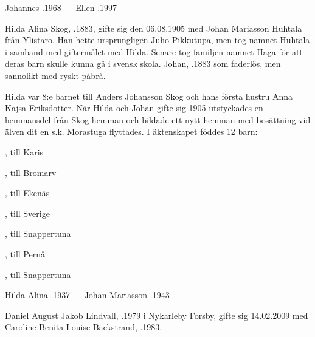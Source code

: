 Johannes .1968   ---    Ellen .1997


Hilda Alina Skog, .1883, gifte sig den 06.08.1905 med Johan Mariasson Huhtala från Ylistaro. Han hette ursprungligen Juho Pikkutupa, men tog namnet Huhtala i samband med giftermålet med Hilda. Senare tog familjen namnet Haga för att deras barn skulle kunna gå i svensk skola. Johan, .1883 som faderlös, men sannolikt med ryskt påbrå.

Hilda var 8:e barnet till Anders Johansson Skog och hans första hustru Anna Kajsa Eriksdotter. När Hilda och Johan gifte sig 1905 utstyckades en hemmansdel från Skog hemman och bildade ett nytt hemman med bosättning vid älven dit en s.k. Morastuga flyttades. I äktenskapet föddes 12 barn:
\begin{jhchildren}
  \item {}
  \item {}
  \item {}
  \item {}, till Karis
  \item {}
  \item {}, till Bromarv
  \item {}, till Ekenäs
  \item {}, till Sverige
  \item {}, till Snappertuna
  \item {}
  \item {}, till Pernå
  \item {}, till Snappertuna
\end{jhchildren}

Hilda Alina .1937  ---   Johan Mariasson .1943






Daniel August Jakob Lindvall, .1979 i Nykarleby Forsby, gifte sig 14.02.2009 med Caroline Benita Louise Bäckstrand, .1983.

